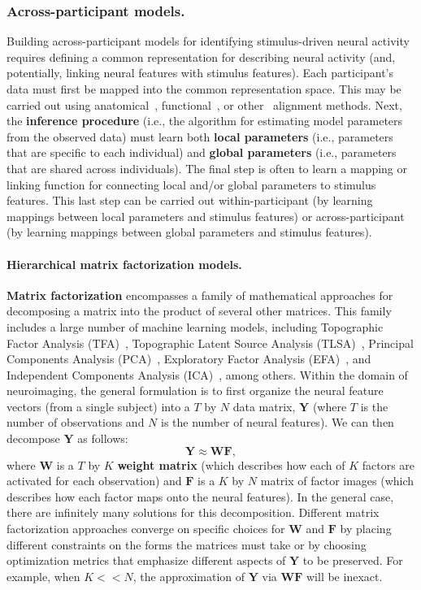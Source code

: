 \documentclass[runningheads]{llncs}
\begin{document}
\subsubsection{Across-participant models.}
Building across-participant models for identifying stimulus-driven
neural activity requires defining a common representation for
describing neural activity (and, potentially, linking neural features
with stimulus features).  Each participant's data must first be mapped
into the common representation space.  This may be carried out using
anatomical~\citep{HermEtal10, ArchEtal07, StudEtal00},
functional~\citep{HaxbEtal11, ChenEtal21, XieEtal21, HaxbEtal20}, or
other~\citep{SabuEtal10, SekiEtal02} alignment methods.  Next, the
\textbf{inference procedure} (i.e., the algorithm for estimating model
parameters from the observed data) must learn both \textbf{local
  parameters} (i.e., parameters that are specific to each individual)
and \textbf{global parameters} (i.e., parameters that are shared
across individuals).  The final step is often to learn a mapping or
linking function for connecting local and/or global parameters to
stimulus features.  This last step can be carried out
within-participant (by learning mappings between local parameters and
stimulus features) or across-participant (by learning mappings between
global parameters and stimulus features).

\paragraph{Hierarchical matrix factorization models.}
\textbf{Matrix factorization} encompasses a family of mathematical
approaches for decomposing a matrix into the product of several other
matrices.  This family includes a large number of machine learning
models, including Topographic Factor Analysis (TFA)~\cite{MannEtal14b,
  MannEtal18}, Topographic Latent Source Analysis
(TLSA)~\cite{GersEtal11}, Principal Components Analysis
(PCA)~\cite{Pear01}, Exploratory Factor Analysis (EFA)~\cite{Spea04},
and Independent Components Analysis (ICA)~\cite{JuttHera91,
  ComoEtal91}, among others.  Within the domain of neuroimaging, the
general formulation is to first organize the neural feature vectors
(from a single subject) into a $T$ by $N$ data matrix, $\mathbf{Y}$
(where $T$ is the number of observations and $N$ is the number of
neural features).  We can then decompose $\mathbf{Y}$ as follows:
\[
  \mathbf{Y} \approx \mathbf{W}\mathbf{F},
  \]
  where $\mathbf{W}$ is a $T$ by $K$ \textbf{weight matrix} (which
  describes how each of $K$ factors are activated for each
  observation) and $\mathbf{F}$ is a $K$ by $N$ matrix of factor
  images (which describes how each factor maps onto the neural
  features).  In the general case, there are infinitely many solutions
  for this decomposition.  Different matrix factorization approaches
  converge on specific choices for $\mathbf{W}$ and $\mathbf{F}$ by
  placing different constraints on the forms the matrices must take or
  by choosing optimization metrics that emphasize different aspects of
  $\mathbf{Y}$ to be preserved.  For example, when $K << N$, the
  approximation of $\mathbf{Y}$ via $\mathbf{W}\mathbf{F}$ will be
  inexact.
  
\end{document}
